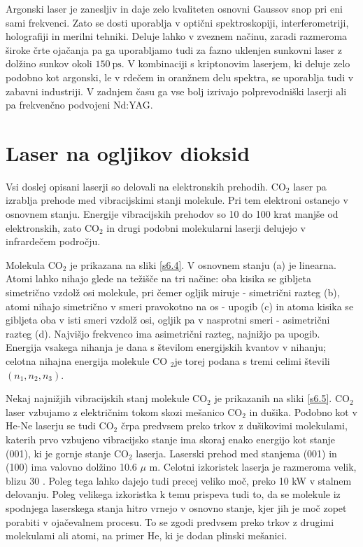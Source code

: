 Argonski laser je zanesljiv in daje zelo kvaliteten osnovni Gaussov snop pri eni
sami frekvenci. Zato se dosti uporablja v optični spektroskopiji,
interferometriji, holografiji in merilni tehniki. Deluje lahko v zveznem načinu,
zaradi razmeroma široke črte ojačanja pa ga uporabljamo tudi za fazno uklenjen
sunkovni laser z dolžino sunkov okoli $150~\si{\pico\second}$. 
V kombinaciji s kriptonovim laserjem, ki deluje zelo podobno kot argonski, 
le v rdečem in oranžnem delu spektra, se uporablja tudi v zabavni industriji.
V zadnjem času ga vse bolj izrivajo polprevodniški laserji ali pa frekvenčno
podvojeni Nd:YAG. 

\section{Laser na ogljikov dioksid}

Vsi doslej opisani laserji so delovali na elektronskih prehodih. CO$_2$
laser pa izrablja prehode med vibracijskimi stanji molekule. Pri tem
elektroni ostanejo v osnovnem stanju. Energije vibracijskih prehodov so 10
do 100 krat manjše od elektronskih, zato CO$_2$ in drugi podobni
molekularni laserji delujejo v infrardečem področju.

Molekula CO$_2$ je prikazana na sliki \ref{s6.4}. V osnovnem stanju (a) je
linearna. Atomi lahko nihajo glede na težišče na tri načine: oba kisika
se gibljeta simetrično vzdolž osi molekule, pri čemer ogljik miruje -
simetrični razteg (b), atomi nihajo simetrično v smeri pravokotno na os -
upogib (c) in atoma kisika se gibljeta oba v isti smeri vzdolž osi, ogljik
pa v nasprotni smeri - asimetrični razteg (d). Najvišjo frekvenco ima
asimetrični razteg, najnižjo pa upogib. Energija vsakega nihanja je dana s
številom energijskih kvantov v nihanju; celotna nihajna energija molekule CO%
$_2$je torej podana s tremi celimi števili $(n_1,n_2,n_3)$.

Nekaj najnižjih vibracijskih stanj molekule CO$_2$ je prikazanih na sliki 
\ref{s6.5}. CO$_2$ laser vzbujamo z električnim tokom skozi mešanico CO$_2$
in dušika. Podobno kot v He-Ne laserju se tudi CO$_2$ črpa predvsem preko
trkov z dušikovimi molekulami, katerih prvo vzbujeno vibracijsko stanje ima
skoraj enako energijo kot stanje (001), ki je gornje stanje CO$_2$ laserja.
Laserski prehod med stanjema (001) in (100) ima valovno dolžino 10.6 $\mu$%
m. Celotni izkoristek laserja je razmeroma velik, blizu 30%
. Poleg tega lahko dajejo tudi precej veliko moč, preko
10 kW v stalnem delovanju. Poleg velikega izkoristka k temu prispeva tudi
to, da se molekule iz spodnjega laserskega stanja hitro vrnejo v osnovno
stanje, kjer jih je moč zopet porabiti v ojačevalnem procesu. To se zgodi
predvsem preko trkov z drugimi molekulami ali atomi, na primer He, ki je
dodan plinski mešanici.

